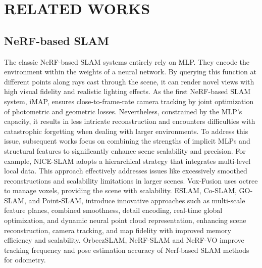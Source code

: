 \documentclass[lettersize,journal]{IEEEtran}
\begin{document}
\section{RELATED WORKS}
\subsection{NeRF-based SLAM}
The classic NeRF-based SLAM systems entirely rely on MLP. They encode the environment within the weights of a neural network. By querying this function at different points along rays cast through the scene, it can render novel views with high visual fidelity and realistic lighting effects. As the first NeRF-based SLAM system, iMAP\cite{imap}, ensures close-to-frame-rate camera tracking by joint optimization of photometric and geometric losses. Nevertheless, constrained by the MLP's capacity, it results in less intricate reconstruction and encounters difficulties with catastrophic forgetting when dealing with larger environments. To address this issue, subsequent works focus on combining the strengths of implicit MLPs and structural features to significantly enhance scene scalability and precision. For example, NICE-SLAM\cite{niceslam} adopts a hierarchical strategy that integrates multi-level local data. This approach effectively addresses issues like excessively smoothed reconstructions and scalability limitations in larger scenes. Vox-Fusion uses octree to manage voxels, providing the scene with scalability. ESLAM\cite{esslam}, Co-SLAM\cite{coslam}, GO-SLAM\cite{goslam}, and Point-SLAM\cite{pointslam}, introduce innovative approaches such as multi-scale feature planes, combined smoothness, detail encoding, real-time global optimization, and dynamic neural point cloud representation, enhancing scene reconstruction, camera tracking, and map fidelity with improved memory efficiency and scalability. OrbeezSLAM\cite{orbeez}, NeRF-SLAM\cite{nerfslam} and NeRF-VO\cite{nerfvo} improve tracking frequency and pose estimation accuracy of Nerf-based SLAM methods for odometry.
\end{document}
